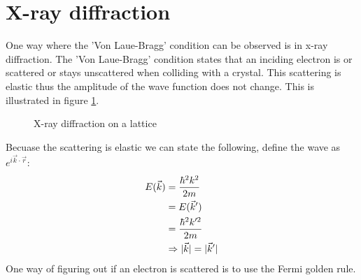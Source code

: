 \section{X-ray diffraction}
One way where the 'Von Laue-Bragg' condition can be observed is in x-ray diffraction. The 'Von Laue-Bragg' condition states that an inciding electron is or scattered or stays unscattered when colliding with a crystal. This scattering is elastic thus the amplitude of the wave function does not change. This is illustrated in figure \ref{fig:vonlaue}.
\begin{figure}[b]
    \centering
    \caption{X-ray diffraction on a lattice}
    \label{fig:vonlaue}
\end{figure}
Becuase the scattering is elastic we can state the following, define the wave as $e^{i\vec{k}\cdot\vec{r}}$:
\begin{align}
	E(\vec{k}) &= \frac{\hbar^2k^2}{2m}\\
	&= E(\vec{k}')\\
	&= \frac{\hbar^2k'^2}{2m}\\
	&\Rightarrow \lvert\vec{k}\rvert = \lvert\vec{k}'\rvert
\end{align}
One way of figuring out if an electron is scattered is to use the Fermi golden rule.

